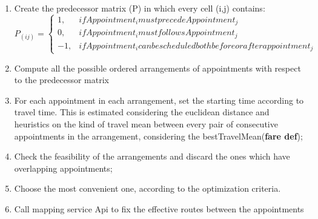 \begin{enumerate}
\item Create the predecessor matrix (P) in which every cell (i,j) contains:
\begin{equation}
    P_(ij)=
    \begin{cases}
      1, & if Appointment_i must precede Appointment_j \\
      0, & if Appointment_i must follows Appointment_j \\
      -1, & if Appointment_i can be scheduled both before or after appointment_j
    \end{cases}
  \end{equation}
\item Compute all the possible ordered arrangements of appointments with respect to the predecessor matrix
\item For each appointment in each arrangement, set the starting time according to travel time. This is estimated considering the euclidean distance and heuristics on the kind of travel mean between every pair of consecutive appointments in the arrangement, considering the bestTravelMean(\textbf{fare def});
\item Check the feasibility of the arrangements and discard the ones which have overlapping appointments;
\item Choose the most convenient one, according to the optimization criteria.
\item Call mapping service Api to fix the effective routes between the appointments
\end{enumerate}

